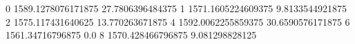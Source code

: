 0 1589.1278076171875 27.7806396484375
1 1571.1605224609375 9.8133544921875
2 1575.117431640625 13.770263671875
4 1592.0062255859375 30.6590576171875
6 1561.34716796875 0.0
8 1570.428466796875 9.081298828125
